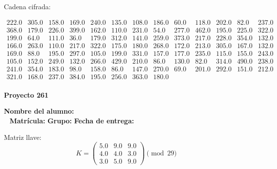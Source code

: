 \documentclass[12pt]{article}
\begin{document}
Cadena cifrada:
\begin{center}
$\begin{array}{lllllllllllll}
222.0 & 305.0 & 158.0 & 169.0 & 240.0 & 135.0 & 108.0 & 186.0 & 60.0 & 118.0 & 202.0 & 82.0 & 237.0\\
368.0 & 179.0 & 226.0 & 399.0 & 162.0 & 110.0 & 231.0 & 54.0 & 277.0 & 462.0 & 195.0 & 225.0 & 322.0\\
199.0 & 64.0 & 111.0 & 36.0 & 179.0 & 312.0 & 141.0 & 259.0 & 373.0 & 217.0 & 228.0 & 354.0 & 132.0\\
166.0 & 263.0 & 110.0 & 217.0 & 322.0 & 175.0 & 180.0 & 268.0 & 172.0 & 213.0 & 305.0 & 167.0 & 132.0\\
169.0 & 88.0 & 195.0 & 297.0 & 105.0 & 199.0 & 331.0 & 157.0 & 177.0 & 235.0 & 115.0 & 155.0 & 243.0\\
105.0 & 152.0 & 249.0 & 132.0 & 266.0 & 429.0 & 210.0 & 86.0 & 130.0 & 82.0 & 314.0 & 490.0 & 238.0\\
241.0 & 354.0 & 183.0 & 98.0 & 158.0 & 86.0 & 147.0 & 270.0 & 69.0 & 201.0 & 292.0 & 151.0 & 212.0\\
321.0 & 168.0 & 237.0 & 384.0 & 195.0 & 256.0 & 363.0 & 180.0\\
\end{array}$
\end{center}

\newpage


\textbf{Proyecto 261}

\textbf{Nombre del alumno:} \underline{\hspace{13cm}}\\\
\vspace{1cm}
\textbf{Matrícula:} \underline{\hspace{4cm}} \hspace{1cm}
\textbf{Grupo:} \underline{\hspace{2cm}}
\textbf{Fecha de entrega:} \underline{\hspace{2cm}}

\medskip

Matriz llave:
\[
K = \begin{pmatrix}
5.0 & 9.0 & 9.0\\
4.0 & 4.0 & 3.0\\
3.0 & 5.0 & 9.0
\end{pmatrix} \pmod{29}
\]
\end{document}
